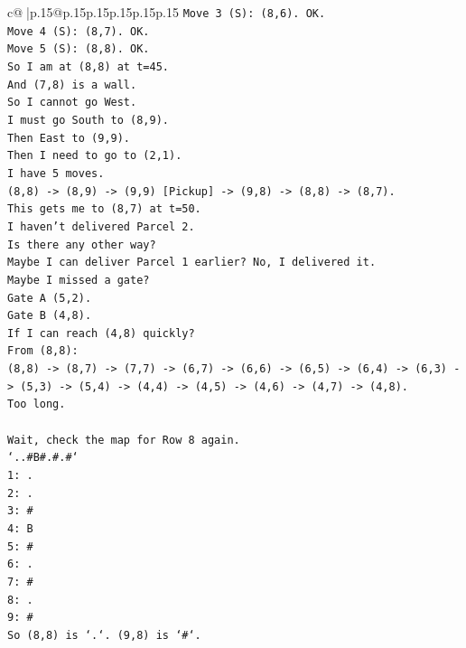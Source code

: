 \documentclass{article}
\begin{document}
{\begin{supertabular}{c@{$\;$}|p{.15\linewidth}@{}p{.15\linewidth}p{.15\linewidth}p{.15\linewidth}p{.15\linewidth}p{.15\linewidth}}
{{{\texttt{Move 3 (S): (8,6). OK.} \\
\texttt{Move 4 (S): (8,7). OK.} \\
\texttt{Move 5 (S): (8,8). OK.} \\
\texttt{So I am at (8,8) at t=45.} \\
\texttt{And (7,8) is a wall.} \\
\texttt{So I cannot go West.} \\
\texttt{I must go South to (8,9).} \\
\texttt{Then East to (9,9).} \\
\texttt{Then I need to go to (2,1).} \\
\texttt{I have 5 moves.} \\
\texttt{(8,8) {-}> (8,9) {-}> (9,9) {[}Pickup{]} {-}> (9,8) {-}> (8,8) {-}> (8,7).} \\
\texttt{This gets me to (8,7) at t=50.} \\
\texttt{I haven't delivered Parcel 2.} \\
\texttt{Is there any other way?} \\
\texttt{Maybe I can deliver Parcel 1 earlier? No, I delivered it.} \\
\texttt{Maybe I missed a gate?} \\
\texttt{Gate A (5,2).} \\
\texttt{Gate B (4,8).} \\
\texttt{If I can reach (4,8) quickly?} \\
\texttt{From (8,8):} \\
\texttt{(8,8) {-}> (8,7) {-}> (7,7) {-}> (6,7) {-}> (6,6) {-}> (6,5) {-}> (6,4) {-}> (6,3) {-}> (5,3) {-}> (5,4) {-}> (4,4) {-}> (4,5) {-}> (4,6) {-}> (4,7) {-}> (4,8).} \\
\texttt{Too long.} \\
\\ 
\texttt{Wait, check the map for Row 8 again.} \\
\texttt{`..\#B\#.\#.\#`} \\
\texttt{1: .} \\
\texttt{2: .} \\
\texttt{3: \#} \\
\texttt{4: B} \\
\texttt{5: \#} \\
\texttt{6: .} \\
\texttt{7: \#} \\
\texttt{8: .} \\
\texttt{9: \#} \\
\texttt{So (8,8) is `.`. (9,8) is `\#`.} \\
}}}
\end{supertabular}}
\end{document}
